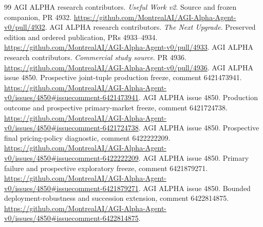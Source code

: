 \documentclass[11pt,a4paper]{article}
\begin{document}
\begin{thebibliography}{99}
 AGI ALPHA research contributors. \emph{Useful Work v2}.
Source and frozen companion, PR 4932.
\url{https://github.com/MontrealAI/AGI-Alpha-Agent-v0/pull/4932}.
 AGI ALPHA research contributors. \emph{The Next Upgrade}.
Preserved edition and ordered publication, PRs 4933--4934.
\url{https://github.com/MontrealAI/AGI-Alpha-Agent-v0/pull/4933}.
 AGI ALPHA research contributors. \emph{Commercial study source}.
PR 4936. \url{https://github.com/MontrealAI/AGI-Alpha-Agent-v0/pull/4936}.
 AGI ALPHA issue 4850.
Prospective joint-tuple production freeze, comment 6421473941.
\url{https://github.com/MontrealAI/AGI-Alpha-Agent-v0/issues/4850#issuecomment-6421473941}.
 AGI ALPHA issue 4850.
Production outcome and prospective primary-market freeze, comment 6421724738.
\url{https://github.com/MontrealAI/AGI-Alpha-Agent-v0/issues/4850#issuecomment-6421724738}.
 AGI ALPHA issue 4850.
Prospective final pricing-policy diagnostic, comment 6422222209.
\url{https://github.com/MontrealAI/AGI-Alpha-Agent-v0/issues/4850#issuecomment-6422222209}.
 AGI ALPHA issue 4850.
Primary failure and prospective exploratory freeze, comment 6421879271.
\url{https://github.com/MontrealAI/AGI-Alpha-Agent-v0/issues/4850#issuecomment-6421879271}.
 AGI ALPHA issue 4850.
Bounded deployment-robustness and succession extension, comment 6422814875.
\url{https://github.com/MontrealAI/AGI-Alpha-Agent-v0/issues/4850#issuecomment-6422814875}.
\end{thebibliography}
\end{document}

